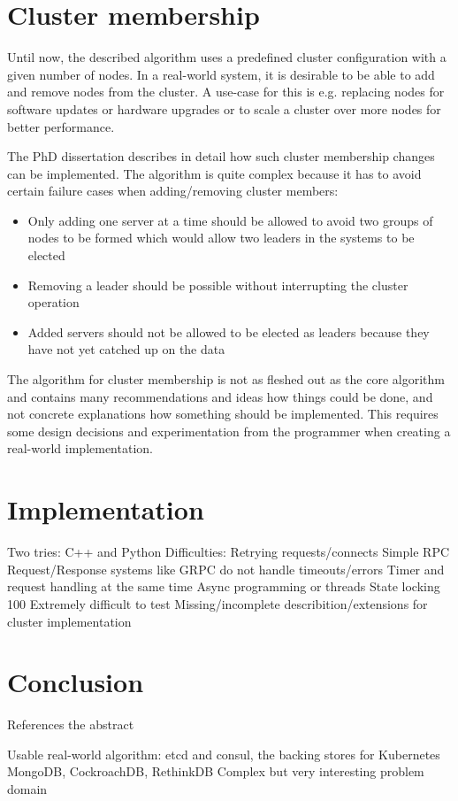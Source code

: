 \section{Cluster membership}
Until now, the described algorithm uses a predefined cluster configuration with a given number of nodes. In a real-world system, it is desirable to
be able to add and remove nodes from the cluster. A use-case for this is e.g. replacing nodes for software updates or hardware upgrades or to
scale a cluster over more nodes for better performance.

The PhD dissertation \cite{raft_phd_thesis} describes in detail how such cluster membership changes can be implemented.
The algorithm is quite complex because it has to avoid certain failure cases when adding/removing cluster members:

\begin{itemize}
    \item Only adding one server at a time should be allowed to avoid two groups of nodes to be formed which would allow two leaders in the systems to be elected
    \item Removing a leader should be possible without interrupting the cluster operation
    \item Added servers should not be allowed to be elected as leaders because they have not yet catched up on the data
\end{itemize}

The algorithm for cluster membership is not as fleshed out as the core algorithm and contains many recommendations and ideas how things could be done, and not 
concrete explanations how something should be implemented. This requires some design decisions and experimentation from the programmer when creating a real-world implementation.

\section{Implementation}
Two tries: C++ and Python
Difficulties:
Retrying requests/connects
Simple RPC Request/Response systems like GRPC do not handle timeouts/errors 
Timer and request handling at the same time
Async programming or threads
State locking
100%
Extremely difficult to test
Missing/incomplete describition/extensions for cluster implementation

\section{Conclusion}
References the abstract

Usable real-world algorithm:
etcd and consul, the backing stores for Kubernetes
MongoDB, CockroachDB, RethinkDB
Complex but very interesting problem domain



 


